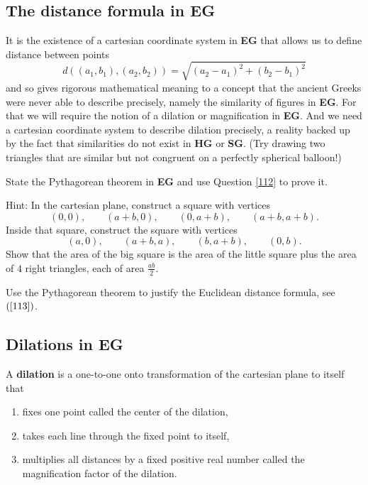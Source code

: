 \pagebreak

\subsection*{The distance formula in \textbf{EG}}

It is the existence of a cartesian coordinate system in \textbf{EG} that
allows us to define distance between points%
\begin{equation}
d\left(  \left(  a_{1},b_{1}\right)  ,\left(  a_{2},b_{2}\right)  \right)
=\sqrt{\left(  a_{2}-a_{1}\right)  ^{2}+\left(  b_{2}-b_{1}\right)  ^{2}}
\label{113}%
\end{equation}
and so gives rigorous mathematical meaning to a concept that the ancient
Greeks were never able to describe precisely, namely the similarity of figures
in \textbf{EG}. For that we will require the notion of a dilation or
magnification in \textbf{EG}. And we need a cartesian coordinate system to
describe dilation precisely, a reality backed up by the fact that similarities
do not exist in \textbf{HG} or \textbf{SG}. (Try drawing two triangles that
are similar but not congruent on a perfectly spherical balloon!)

\begin{question}
State the Pythagorean theorem in \textbf{EG} and use Question
\ref{112} to prove it.

Hint: In the cartesian plane, construct a square with vertices 
\[
\left(0,0\right),\qquad \left(a+b,0\right),\qquad \left(0,a+b\right), \qquad \left( a+b,a+b\right).
\] 
Inside that square, construct the square with vertices 
\[
\left(a,0\right),\qquad \left(a+b,a\right),\qquad \left(b,a+b\right), \qquad \left(0,b\right).
\]
Show that the area of the big square is the area of the little square
plus the area of $4$ right triangles, each of area $\frac{ab}{2}$.
\end{question}

\begin{question}
Use the Pythagorean theorem to justify the Euclidean distance formula,
see $\left(\ref{113}\right)$.
\end{question}

\pagebreak

\subsection*{Dilations in \textbf{EG}}

\begin{definition}
A \textbf{dilation} is a one-to-one onto transformation of the
cartesian plane to itself that
\begin{enumerate}
\item fixes one point called the center of the dilation,
\item takes each line through the fixed point to itself,
\item multiplies all distances by a fixed positive real number called the
magnification factor of the dilation.
\end{enumerate}
\end{definition}

